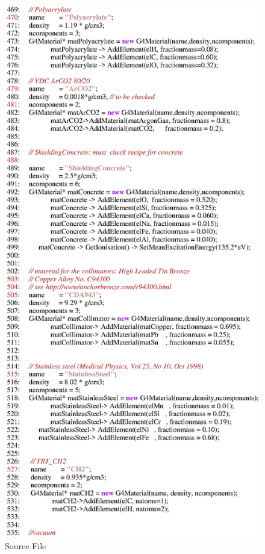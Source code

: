 \begin{figure}[h]
  \hspace{0cm}
  \includegraphics[scale=0.8]{./figures17/QweakSimMaterial.cc-p8.eps}
  \caption{\label{SourceXVII9} Source File}
           \label{fig:XVII-SC-9}
\end{figure}
\clearpage

